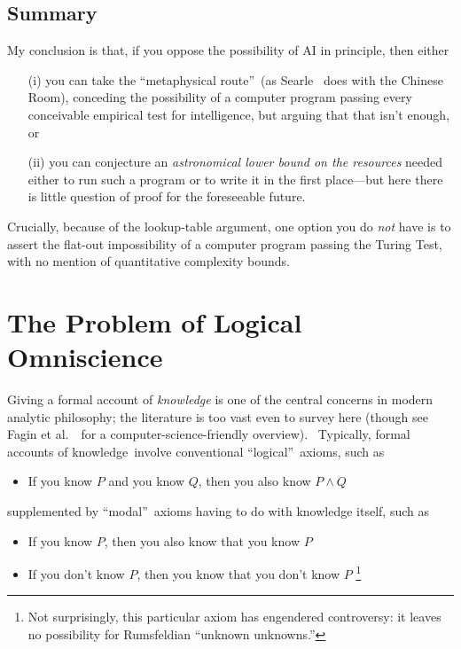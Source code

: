 \documentclass[11pt,onecolumn]{article}%
\begin{document}
\subsection{Summary}

My conclusion is that, if you oppose the possibility of AI in principle, then either

\begin{enumerate}
\item[(i)] you can take the \textquotedblleft metaphysical
route\textquotedblright\ (as Searle \cite{searle}\ does with the Chinese
Room), conceding the possibility of a computer program passing every
conceivable empirical test for intelligence, but arguing that that isn't
enough, or

\item[(ii)] you can conjecture an \textit{astronomical lower bound on the
resources} needed either to run such a program or to write it in the first
place---but here there is little question of proof for the foreseeable future.
\end{enumerate}

\noindent Crucially, because of the lookup-table argument, one option you do
\textit{not} have is to assert the flat-out impossibility of a computer
program passing the Turing Test, with no mention of quantitative complexity bounds.

\section{The Problem of Logical Omniscience\label{OMNI}}

Giving a formal account of \textit{knowledge} is one of the central concerns
in modern analytic philosophy; the literature is too vast even to survey here
(though see Fagin et al.\ \cite{fhmv}\ for a computer-science-friendly
overview). \ Typically, formal accounts of knowledge\ involve conventional
\textquotedblleft logical\textquotedblright\ axioms, such as

\begin{itemize}
\item If you know $P$ and you know $Q$, then you also know $P\wedge Q$
\end{itemize}

\noindent supplemented by \textquotedblleft modal\textquotedblright\ axioms
having to do with knowledge itself, such as

\begin{itemize}
\item If you know $P$, then you also know that you know $P$

\item If you don't know $P$, then you know that you don't know $P$%
\footnote{Not surprisingly, this particular axiom has engendered controversy:
it leaves no possibility for Rumsfeldian \textquotedblleft unknown
unknowns.\textquotedblright}
\end{itemize}
\end{document}
